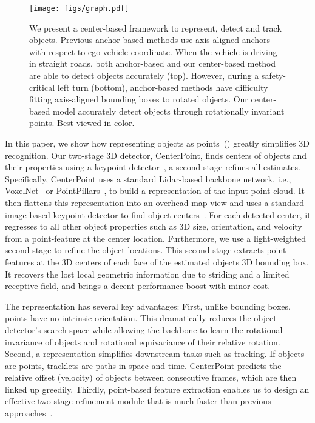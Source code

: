 \documentclass[final]{cvpr}
\begin{document}
\begin{figure}[t]
   \centering
   \texttt{[image: figs/graph.pdf]}
   \caption{
    We present a center-based framework to represent, detect and track objects. Previous anchor-based methods use axis-aligned anchors with respect to ego-vehicle coordinate. When the vehicle is driving in straight roads, both anchor-based and our center-based method are able to detect objects accurately (top). However, during a safety-critical left turn (bottom), anchor-based methods have difficulty fitting axis-aligned bounding boxes to rotated objects. Our center-based model accurately detect objects through rotationally invariant points. Best viewed in color.  
   }
\vspace{-3mm}
\end{figure}


In this paper, we show how representing objects as points~() greatly simplifies 3D recognition.
Our two-stage 3D detector, CenterPoint, finds centers of objects and their properties using a keypoint detector~\cite{zhou2019objects}, a second-stage refines all estimates.
Specifically, CenterPoint uses a standard Lidar-based backbone network, i.e., VoxelNet~\cite{voxelnet, yan2018second} or PointPillars~\cite{pillar}, to build a representation of the input point-cloud.
It then flattens this representation into an overhead map-view and uses a standard image-based keypoint detector to find object centers~\cite{zhou2019objects}.
For each detected center, it regresses to all other object properties such as 3D size, orientation, and velocity from a point-feature at the center location.
Furthermore, we use a light-weighted second stage to refine the object locations.
This second stage extracts point-features at the 3D centers of each face of the estimated objects 3D bounding box.
It recovers the lost local geometric information due to striding and a limited receptive field, and brings a decent performance boost with minor cost.

The \pb representation has several key advantages: First, unlike bounding boxes, points have no intrinsic orientation.
This dramatically reduces the object detector's search space while allowing the backbone to learn the rotational invariance of objects and rotational equivariance of their relative rotation.
Second, a \pb representation simplifies downstream tasks such as tracking.
If objects are points, tracklets are paths in space and time.
CenterPoint predicts the relative offset (velocity) of objects between consecutive frames, which are then linked up greedily.
Thirdly, point-based feature extraction enables us to design an effective two-stage refinement module that is much faster than previous approaches~\cite{pvrcnn, PartA,shi2019pointrcnn}.
\end{document}
